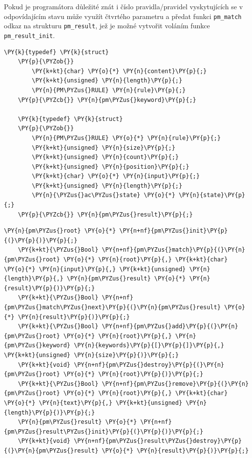 Pokud je programátora důležité znát i číslo pravidla/pravidel vyskytujících se v odpovídajícím stavu
může využít čtvrtého parametru a předat funkci \texttt{pm\_match} odkaz na strukturu \texttt{pm\_result},
jež je možné vytvořit voláním funkce \texttt{pm\_result\_init}.

\begin{Verbatim}[commandchars=\\\{\}]
	\PY{k}{typedef} \PY{k}{struct}
	\PY{p}{\PYZob{}}
		\PY{k+kt}{char} \PY{o}{*} \PY{n}{content}\PY{p}{;}
		\PY{k+kt}{unsigned} \PY{n}{length}\PY{p}{;}
		\PY{n}{PM\PYZus{}RULE} \PY{n}{rule}\PY{p}{;}
	\PY{p}{\PYZcb{}} \PY{n}{pm\PYZus{}keyword}\PY{p}{;}

	\PY{k}{typedef} \PY{k}{struct}
	\PY{p}{\PYZob{}}
		\PY{n}{PM\PYZus{}RULE} \PY{o}{*} \PY{n}{rule}\PY{p}{;}
		\PY{k+kt}{unsigned} \PY{n}{size}\PY{p}{;}
		\PY{k+kt}{unsigned} \PY{n}{count}\PY{p}{;}
		\PY{k+kt}{unsigned} \PY{n}{position}\PY{p}{;}
		\PY{k+kt}{char} \PY{o}{*} \PY{n}{input}\PY{p}{;}
		\PY{k+kt}{unsigned} \PY{n}{length}\PY{p}{;}
		\PY{n}{\PYZus{}ac\PYZus{}state} \PY{o}{*} \PY{n}{state}\PY{p}{;}
	\PY{p}{\PYZcb{}} \PY{n}{pm\PYZus{}result}\PY{p}{;}
\end{Verbatim}


\begin{Verbatim}[commandchars=\\\{\}]
	\PY{n}{pm\PYZus{}root} \PY{o}{*} \PY{n+nf}{pm\PYZus{}init}\PY{p}{(}\PY{p}{)}\PY{p}{;}
	\PY{k+kt}{\PYZus{}Bool} \PY{n+nf}{pm\PYZus{}match}\PY{p}{(}\PY{n}{pm\PYZus{}root} \PY{o}{*} \PY{n}{root}\PY{p}{,} \PY{k+kt}{char} \PY{o}{*} \PY{n}{input}\PY{p}{,} \PY{k+kt}{unsigned} \PY{n}{length}\PY{p}{,} \PY{n}{pm\PYZus{}result} \PY{o}{*} \PY{n}{result}\PY{p}{)}\PY{p}{;}
	\PY{k+kt}{\PYZus{}Bool} \PY{n+nf}{pm\PYZus{}match\PYZus{}next}\PY{p}{(}\PY{n}{pm\PYZus{}result} \PY{o}{*} \PY{n}{result}\PY{p}{)}\PY{p}{;}
	\PY{k+kt}{\PYZus{}Bool} \PY{n+nf}{pm\PYZus{}add}\PY{p}{(}\PY{n}{pm\PYZus{}root} \PY{o}{*} \PY{n}{root}\PY{p}{,} \PY{n}{pm\PYZus{}keyword} \PY{n}{keywords}\PY{p}{[}\PY{p}{]}\PY{p}{,} \PY{k+kt}{unsigned} \PY{n}{size}\PY{p}{)}\PY{p}{;}
	\PY{k+kt}{void} \PY{n+nf}{pm\PYZus{}destroy}\PY{p}{(}\PY{n}{pm\PYZus{}root} \PY{o}{*} \PY{n}{root}\PY{p}{)}\PY{p}{;}
	\PY{k+kt}{\PYZus{}Bool} \PY{n+nf}{pm\PYZus{}remove}\PY{p}{(}\PY{n}{pm\PYZus{}root} \PY{o}{*} \PY{n}{root}\PY{p}{,} \PY{k+kt}{char} \PY{o}{*} \PY{n}{text}\PY{p}{,} \PY{k+kt}{unsigned} \PY{n}{length}\PY{p}{)}\PY{p}{;}
	\PY{n}{pm\PYZus{}result} \PY{o}{*} \PY{n+nf}{pm\PYZus{}result\PYZus{}init}\PY{p}{(}\PY{p}{)}\PY{p}{;}
	\PY{k+kt}{void} \PY{n+nf}{pm\PYZus{}result\PYZus{}destroy}\PY{p}{(}\PY{n}{pm\PYZus{}result} \PY{o}{*} \PY{n}{result}\PY{p}{)}\PY{p}{;}
\end{Verbatim}

